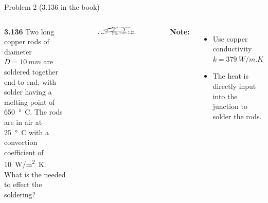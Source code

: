 \documentclass[9pt, aspectratio=169, handout]{beamer}
\begin{document}
\begin{frame}{Problem 2 (3.136 in the book)}
    \begin{columns}
        \textbf{3.136} Two long copper rods of diameter $D=\SI{10}{mm}$ are soldered together end to end, with solder having a melting point of \SI{650}{\degree C}. The rods are in air at \SI{25}{\degree C} with a convection coefficient of \SI{10}{W/m^2.K}. What is the  needed to effect the soldering?
        \vspace{2ex}
        \begin{figure}
            \begin{center}
                \includegraphics[width=0.95\textwidth]{Figures/fig2.1.jpg}
            \end{center}
        \end{figure}
        \vspace{2ex}
        \textbf{Note:}
        \begin{itemize}
            \item Use copper conductivity $k = \SI{379}{W/m.K}$
            \item The heat is directly input into the junction to solder the rods.
        \end{itemize}

    \end{columns}
\end{frame}
\end{document}
